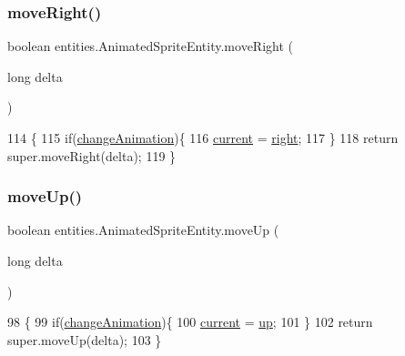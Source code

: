 \subsubsection{\texorpdfstring{move\+Right()}{moveRight()}}
{\footnotesize\ttfamily boolean entities.\+Animated\+Sprite\+Entity.\+move\+Right (\begin{DoxyParamCaption}\item[{long}]{delta }\end{DoxyParamCaption})\hspace{0.3cm}{\ttfamily [inline]}}


\begin{DoxyCode}
114                                          \{
115         \textcolor{keywordflow}{if}(\mbox{\hyperlink{classentities_1_1_animated_sprite_entity_ac5b06797e6a716cb04b883d92301fabf}{changeAnimation}})\{
116             \mbox{\hyperlink{classentities_1_1_animated_sprite_entity_ab44999a4be67c7ce81f4da6b5d333ce5}{current}} = \mbox{\hyperlink{classentities_1_1_animated_sprite_entity_acae197ec16525f140d7285eec19e18da}{right}};
117         \}
118         \textcolor{keywordflow}{return} super.moveRight(delta);
119     \}
\end{DoxyCode}
\mbox{\label{classentities_1_1_animated_sprite_entity_ad55c31998d2dac72b458d5428776fc57}} 
\subsubsection{\texorpdfstring{move\+Up()}{moveUp()}}
{\footnotesize\ttfamily boolean entities.\+Animated\+Sprite\+Entity.\+move\+Up (\begin{DoxyParamCaption}\item[{long}]{delta }\end{DoxyParamCaption})\hspace{0.3cm}{\ttfamily [inline]}}


\begin{DoxyCode}
98                                       \{
99         \textcolor{keywordflow}{if}(\mbox{\hyperlink{classentities_1_1_animated_sprite_entity_ac5b06797e6a716cb04b883d92301fabf}{changeAnimation}})\{
100             \mbox{\hyperlink{classentities_1_1_animated_sprite_entity_ab44999a4be67c7ce81f4da6b5d333ce5}{current}} = \mbox{\hyperlink{classentities_1_1_animated_sprite_entity_aa3f0c36879bc4afe3d25f744f357b5b6}{up}};
101         \}
102         \textcolor{keywordflow}{return} super.moveUp(delta);
103     \}
\end{DoxyCode}
\mbox{\label{classentities_1_1_animated_sprite_entity_a5b365fae190a30e44ef7396da665f9b7}} 
